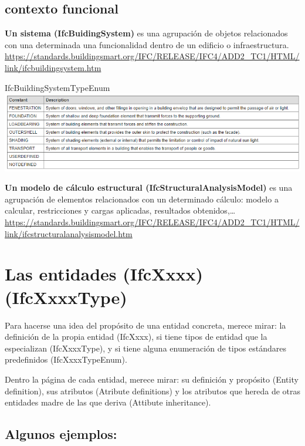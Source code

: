 \documentclass[spanish,12pt,a4paper,final,oneside]{book}
\begin{document}
\subsection{contexto funcional}
\textbf{Un sistema (IfcBuidingSystem)} es una agrupación de objetos relacionados con una determinada una funcionalidad  dentro de un edificio o infraestructura.
\\ \url{https://standards.buildingsmart.org/IFC/RELEASE/IFC4/ADD2_TC1/HTML/link/ifcbuildingsystem.htm}

IfcBuildingSystemTypeEnum
\\ \includegraphics[width=\textwidth]{Definicion de IfcBuildingSystemTypeEnum}

\textbf{Un modelo de cálculo estructural (IfcStructuralAnalysisModel)} es una agrupación de elementos relacionados con un determinado cálculo: modelo a calcular, restricciones y cargas aplicadas, resultados obtenidos,\ldots 
\\ \url{https://standards.buildingsmart.org/IFC/RELEASE/IFC4/ADD2_TC1/HTML/link/ifcstructuralanalysismodel.htm}



\section{Las \textbf{entidades} (IfcXxxx) (IfcXxxxType)}

Para hacerse una idea del propósito de una entidad concreta, merece mirar: la definición de la propia entidad (IfcXxxx), si tiene tipos de entidad que la especializan (IfcXxxxType), y si tiene alguna enumeración de tipos estándares predefinidos (IfcXxxxTypeEnum).

Dentro la página de cada entidad, merece mirar: su definición y propósito (Entity definition), sus atributos (Atribute definitions) y los atributos que hereda de otras entidades madre de las que deriva (Attibute inheritance).


\subsection{Algunos ejemplos:}
\end{document}
